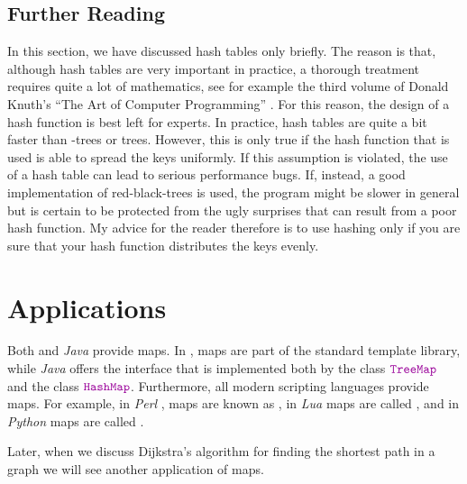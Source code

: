 \subsection{Further Reading}
In this section, we have discussed hash tables only briefly.  The reason is that, although hash tables are very
important in practice, a thorough treatment requires quite a lot of mathematics, see for example the
third volume of Donald Knuth's ``The Art of Computer Programming'' \cite{knuth:1998b}.  For this
reason, the design of a hash function is best left for experts.  In practice, hash tables are
quite a bit faster than -trees or  trees.  However, this is only true if
the hash function that is used is able to spread the keys uniformly.  If this assumption is
violated, the use of a hash table can lead to serious performance 
bugs.  If, instead, a good
implementation of red-black-trees is used, the program might be slower in general but is certain to
be protected from the ugly surprises that can result from a poor hash function.  My advice for the reader
therefore is to use hashing only if you are sure that your hash function distributes the keys evenly.


\section{Applications}
Both  and \textsl{Java} provide maps.  In , maps are part of the standard
template library, while \textsl{Java} offers the interface  that is implemented both by
the class $\mytt{TreeMap}$ and the class $\mytt{HashMap}$. Furthermore, all modern scripting languages provide maps.
For example, in \textsl{Perl} \cite{Wall92}, maps are known as , in \textsl{Lua} 
\cite{ierusalimschy:2006,Ieru96a} maps are called , and in \textsl{Python} 
\cite{vanRossum:95,lutz:09} maps are called .  

Later, when we discuss Dijkstra's algorithm for finding the shortest path in a graph we will see
another application of maps.
\pagebreak

